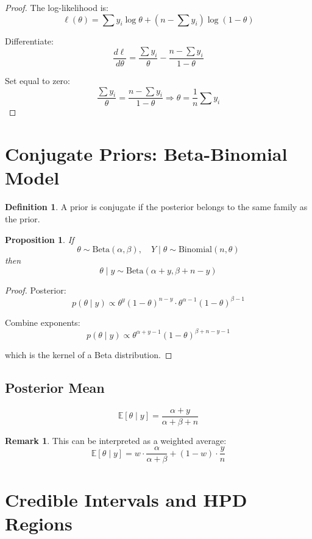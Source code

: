 \documentclass[12pt,oneside]{book}
\numberwithin{equation}{section}
\theoremstyle{definition}
\newtheorem{definition}{Definition}[section]
\newtheorem{remark}{Remark}[section]
\theoremstyle{plain}
\newtheorem{proposition}{Proposition}[section]
\theoremstyle{remark}
\newcommand{\E}{\mathbb{E}}
\newcommand{\Bin}{\mathrm{Binomial}}
\newcommand{\BetaDist}{\mathrm{Beta}}
\begin{document}
\begin{proof}
The log-likelihood is:
$$
\ell(\theta) = \sum y_i \log \theta + (n-\sum y_i)\log(1-\theta)
$$

Differentiate:
$$
\frac{d\ell}{d\theta} = \frac{\sum y_i}{\theta} - \frac{n-\sum y_i}{1-\theta}
$$

Set equal to zero:
$$
\frac{\sum y_i}{\theta} = \frac{n-\sum y_i}{1-\theta}
\Rightarrow \theta = \frac{1}{n}\sum y_i
$$
\end{proof}

\section{Conjugate Priors: Beta-Binomial Model}

\begin{definition}
A prior is conjugate if the posterior belongs to the same family as the prior.
\end{definition}

\begin{proposition}
If
$$
\theta \sim \BetaDist(\alpha,\beta), \quad Y \mid \theta \sim \Bin(n,\theta)
$$
then
$$
\theta \mid y \sim \BetaDist(\alpha + y, \beta + n - y)
$$
\end{proposition}

\begin{proof}
Posterior:
$$
p(\theta \mid y) \propto \theta^y(1-\theta)^{n-y} \cdot \theta^{\alpha-1}(1-\theta)^{\beta-1}
$$

Combine exponents:
$$
p(\theta \mid y) \propto \theta^{\alpha+y-1}(1-\theta)^{\beta+n-y-1}
$$

which is the kernel of a Beta distribution.
\end{proof}

\subsection{Posterior Mean}

$$
\E[\theta \mid y] = \frac{\alpha + y}{\alpha + \beta + n}
$$

\begin{remark}
This can be interpreted as a weighted average:
$$
\E[\theta \mid y] = w \cdot \frac{\alpha}{\alpha+\beta} + (1-w)\cdot \frac{y}{n}
$$
\end{remark}

\section{Credible Intervals and HPD Regions}
\end{document}
